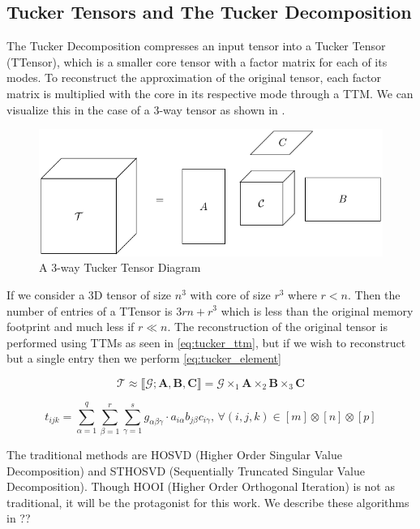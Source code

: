 \subsection{Tucker Tensors and The Tucker Decomposition} \label{sec:Tucker Tensors and The Tucker Decomposition}
    The Tucker Decomposition compresses an input tensor into a Tucker Tensor
    (TTensor), which is a smaller core tensor with a factor matrix for each of
    its modes. To reconstruct the approximation of the original tensor, each
    factor matrix is multiplied with the core in its respective mode through a
    TTM. We can visualize this in the case of a 3-way tensor as shown in
    .

    \begin{figure}[ht]
        \centering
        \includegraphics[scale=1]{tikz/chapter1/section1-2/Tucker_Tensor.pdf}
        \caption[A 3-way Tucker Tensor Diagram]{A 3-way Tucker Tensor Diagram}
        \label{fig:TTensor}
    \end{figure}

    If we consider a 3D tensor of size $n^3$ with core of size $r^3$ where $r <
    n$. Then the number of entries of a TTensor is $3rn + r^3$ which is less
    than the original memory footprint and much less if $r \ll n$. The
    reconstruction of the original tensor is performed using TTMs as seen in
    \ref{eq:tucker_ttm}, but if we wish to reconstruct but a single entry then
    we perform \ref{eq:tucker_element}

    \begin{equation} \label{eq:tucker_ttm}
        \mathcal{T} \approx \llbracket \mathcal{G}; \mathbf{A,B,C} \rrbracket = \mathcal{G} \times_1 \mathbf{A} \times_2 \mathbf{B} \times_3 \mathbf{C}
    \end{equation}
    
    \begin{equation} \label{eq:tucker_element}
        t_{ijk} = \sum_{\alpha = 1}^{q} \sum_{\beta = 1}^{r} \sum_{\gamma = 1}^{s} g_{\alpha \beta \gamma}\cdot a_{i\alpha}b_{j\beta}c_{i\gamma}\text{, }\forall (i, j, k) \in [m]\otimes[n]\otimes[p]
    \end{equation}
    
    
    The traditional methods are
    HOSVD (Higher Order Singular Value Decomposition) and STHOSVD (Sequentially
    Truncated Singular Value Decomposition). Though HOOI (Higher Order
    Orthogonal Iteration) is not as traditional, it will be the protagonist for
    this work. We describe these algorithms in ??

